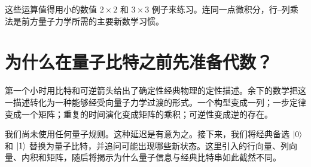这些运算值得用小的数值 \(2\times2\) 和 \(3\times3\) 例子来练习。连同一点微积分，行--列乘法是前方量子力学所需的主要新数学习惯。

\begin{classroomqa}
\end{classroomqa}

\section{为什么在量子比特之前先准备代数？}

第一个小时用比特和可逆箭头给出了确定性经典物理的定性描述。余下的数学把这一描述转化为一种能够经受向量子力学过渡的形式。一个构型变成一列；一步定律变成一个矩阵；重复的时间演化变成矩阵的乘积；可逆性变成逆的存在。

我们尚未使用任何量子规则。这种延迟是有意为之。接下来，我们将经典备选 \(\left\lvert0\right\rangle\) 和 \(\left\lvert1\right\rangle\) 替换为量子比特，并追问可能出现哪些新状态。这里引入的行向量、列向量、内积和矩阵，随后将揭示为什么量子信息与经典比特串如此截然不同。

\begin{classroomqa}
\end{classroomqa}